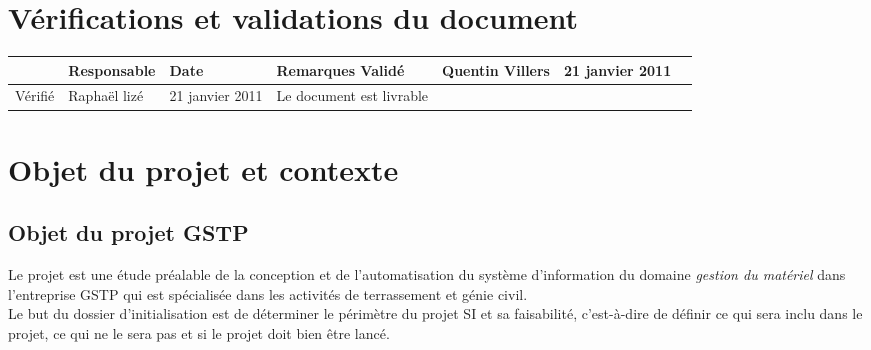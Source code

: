 \documentclass[twoside]{article}
\begin{document}

\section*{Vérifications et validations du document}

\begin{center}
\begin{longtable}{|m{15mm}|m{36mm}|m{36mm}|m{60mm}|}
\hline
 & Responsable & Date & Remarques\endhead \hline
Validé
& %
Quentin Villers
& %
21 janvier 2011
& %
\\\hline
Vérifié
& %
Raphaël lizé
& %
21 janvier 2011
& %
Le document est livrable
\\\hline
\end{longtable}
\end{center}

\pagebreak


\tableofcontents
\vfill
\pagebreak


\section{Objet du projet et contexte}

\subsection{Objet du projet GSTP}
Le projet est une étude préalable de la conception et de l'automatisation
du système d'information du domaine \textsl{gestion du matériel} dans l'entreprise 
GSTP qui est spécialisée dans les activités de terrassement et génie civil.\\

Le but du dossier d'initialisation est de déterminer le périmètre du projet
SI et sa faisabilité, c’est-à-dire de définir ce qui sera inclu
dans le projet, ce qui ne le sera pas et si le projet doit bien être
lancé.\\
\end{document}
